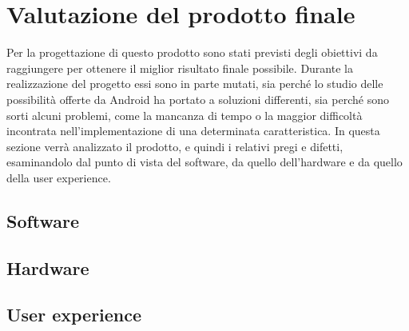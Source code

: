 \section{Valutazione del prodotto finale}
\label{valutazione}
Per la progettazione di questo prodotto sono stati previsti degli obiettivi da raggiungere per ottenere il miglior risultato finale possibile. Durante la realizzazione del progetto essi sono in parte mutati, sia perché lo studio delle possibilità offerte da Android ha portato a soluzioni differenti, sia perché sono sorti alcuni problemi, come la mancanza di tempo o la maggior difficoltà incontrata nell'implementazione di una determinata caratteristica. In questa sezione verrà analizzato il prodotto, e quindi i relativi pregi e difetti, esaminandolo dal punto di vista del software, da quello dell'hardware e da quello della user experience.
	\subsection{Software}
	\subsection{Hardware}
	\subsection{User experience}